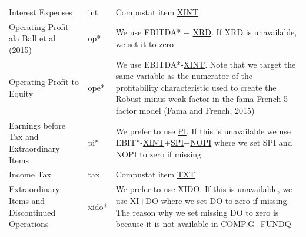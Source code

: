 \documentclass[12pt,title,fleqn]{article}
\begin{document}
{\begin{longtable}{@{\extracolsep{\fill}}|m{5cm}|l|m{8cm}|@{}}
	Interest Expenses &  int & Compustat item \href{https://wrds-www.wharton.upenn.edu/data-dictionary/form_metadata/comp_na_daily_all_funda_incomestatementitems/XINT/}{XINT} \\
	
	Operating Profit ala Ball et al (2015) & op\mbox{*} & We use EBITDA\mbox{*} + \href{https://wrds-www.wharton.upenn.edu/data-dictionary/form_metadata/comp_na_daily_all_funda_incomestatementitems/XRD/}{XRD}. If XRD is unavailable, we set it to zero \\
	
	Operating Profit to Equity & ope\mbox{*} & We use EBITDA\mbox{*}-\href{https://wrds-www.wharton.upenn.edu/data-dictionary/form_metadata/comp_na_daily_all_funda_incomestatementitems/XINT/}{XINT}. Note that we target the same variable as the numerator of the profitability characteristic used to create the Robust-minus weak factor in the fama-French 5 factor model (Fama and French, 2015) \\
	
	Earnings before Tax and Extraordinary Items & pi\mbox{*} & We prefer to use \href{https://wrds-www.wharton.upenn.edu/data-dictionary/form_metadata/comp_na_daily_all_funda_incomestatementitems/PI/}{PI}. If this is unavailable we use EBIT\mbox{*}-\href{https://wrds-www.wharton.upenn.edu/data-dictionary/form_metadata/comp_na_daily_all_funda_incomestatementitems/XINT/}{XINT}+\href{https://wrds-www.wharton.upenn.edu/data-dictionary/form_metadata/comp_na_daily_all_funda_incomestatementitems/SPI/}{SPI}+\href{https://wrds-www.wharton.upenn.edu/data-dictionary/form_metadata/comp_na_daily_all_funda_incomestatementitems/NOPI/}{NOPI} where we set SPI and NOPI to zero if missing\\
	
	Income Tax & tax & Compustat item \href{https://wrds-www.wharton.upenn.edu/data-dictionary/form_metadata/comp_na_daily_all_funda_incomestatementitems/TXT/}{TXT}\\
	
	Extraordinary Items and Discontinued Operations &  xido\mbox{*} & We prefer to use \href{https://wrds-www.wharton.upenn.edu/data-dictionary/form_metadata/comp_na_daily_all_funda_incomestatementitems/XIDO/}{XIDO}. If this is unavailable, we use \href{https://wrds-www.wharton.upenn.edu/data-dictionary/form_metadata/comp_na_daily_all_funda_incomestatementitems/XI/}{XI}+\href{https://wrds-www.wharton.upenn.edu/data-dictionary/form_metadata/comp_na_daily_all_funda_incomestatementitems/DO/}{DO} where we set DO to zero if missing. The reason why we set missing DO to zero is because it is not available in COMP.G\_FUNDQ \\
	

\end{longtable}}
\end{document}
